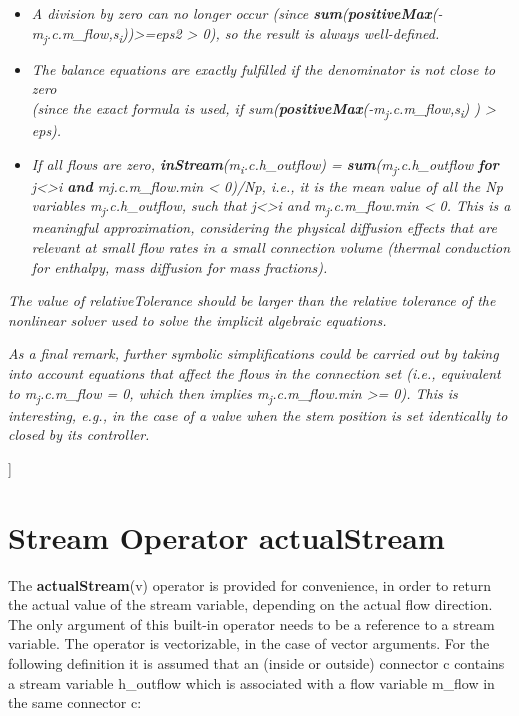 \documentclass[10pt,a4paper]{report}
\def\doublelabel#1{\label{#1}\hypertarget{#1}{}}
\begin{document}
\begin{itemize}
\item
  \emph{A division by zero can no longer occur (since
  \textbf{sum}(\textbf{positiveMax}(-m\textsubscript{j}.c.m\_flow,s\textsubscript{i}))\textgreater{}=eps2
  \textgreater{} 0), so the result is always well-defined.}
\item
  \emph{The balance equations are exactly fulfilled if the denominator
  is not close to zero\\
  (since the exact formula is used, if
  sum(\textbf{positiveMax}(-m\textsubscript{j}.c.m\_flow,s\textsubscript{i})
  ) \textgreater{} eps).}
\item
  \emph{If all flows are zero,
  \textbf{inStream}(m\textsubscript{i}.c.h}\_\emph{outflow) =
  \textbf{sum}(m\textsubscript{j}.c.h\_outflow \textbf{for}
  j\textless{}\textgreater{}i \textbf{and} mj.c.m\_flow.min \textless{}
  0)/Np, i.e., it is the mean value of all the Np variables
  m\textsubscript{j}.c.h}\_\emph{outflow, such that
  j\textless{}\textgreater{}i and
  m\textsubscript{j}.c.m}\_\emph{flow.min \textless{} 0. This is a
  meaningful approximation, considering the physical diffusion effects
  that are relevant at small flow rates in a small connection volume
  (thermal conduction for enthalpy, mass diffusion for mass fractions).}
\end{itemize}

\emph{The value of relativeTolerance should be larger than the relative
tolerance of the nonlinear solver used to solve the implicit algebraic
equations.}

\emph{As a final remark, further symbolic simplifications could be
carried out by taking into account equations that affect the flows in
the connection set (i.e., equivalent to m\textsubscript{j}.c.m\_flow =
0, which then implies m\textsubscript{j}.c.m\_flow.min \textgreater{}=
0). This is interesting, e.g., in the case of a valve when the stem
position is set identically to closed by its controller.}

{]}

\section{Stream Operator actualStream}\doublelabel{stream-operator-actualstream}

The \textbf{actualStream}(v) operator is provided for convenience, in
order to return the actual value of the stream variable, depending on
the actual flow direction. The only argument of this built-in operator
needs to be a reference to a stream variable. The operator is
vectorizable, in the case of vector arguments. For the following
definition it is assumed that an (inside or outside) connector c
contains a stream variable h\_outflow which is associated with a flow
variable m\_flow in the same connector c:
\end{document}
